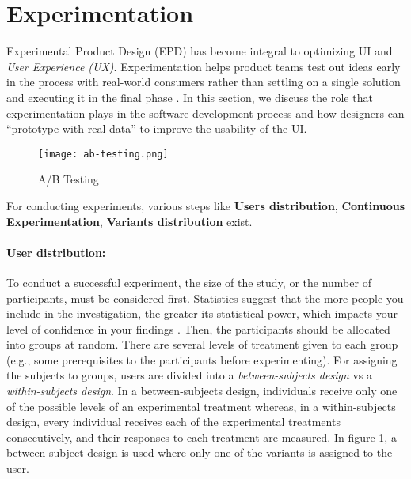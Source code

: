 \section{Experimentation}
\label{background:section:experimentproduct}
Experimental Product Design (EPD) has become integral to optimizing UI and \textit{User Experience (UX)}.
Experimentation helps product teams test out ideas early in the process with real-world consumers rather than settling on a single solution and executing it in the final phase \cite{misc:CE:miklos}.
In this section, we discuss the role that experimentation plays in the software development process and how designers can ``prototype with real data'' to improve the usability of the UI.
\begin{figure}[htbp!]
  \centering    
  \texttt{[image: ab-testing.png]}
  \caption[A/B Testing]{A/B Testing}
  \label{fig:background:abtesting}
\end{figure}
For conducting experiments, various steps like \textbf{Users distribution}, \textbf{Continuous Experimentation}, \textbf{Variants distribution} exist.  

\paragraph{User distribution:} To conduct a successful experiment, the size of the study, or the number of participants, must be considered first.
Statistics suggest that the more people you include in the investigation, the greater its statistical power, which impacts your level of confidence in your findings \cite{misc:experimentation:users}.
Then, the participants should be allocated into groups at random. 
There are several levels of treatment given to each group (e.g., some prerequisites to the participants before experimenting).
For assigning the subjects to groups, users are divided into a \textit{between-subjects design} vs a \textit{within-subjects design}.
In a between-subjects design, individuals receive only one of the possible levels of an experimental treatment whereas, in a within-subjects design, every individual receives each of the experimental treatments consecutively, and their responses to each treatment are measured.
In figure \ref{fig:background:abtesting}, a between-subject design is used where only one of the variants is assigned to the user.

